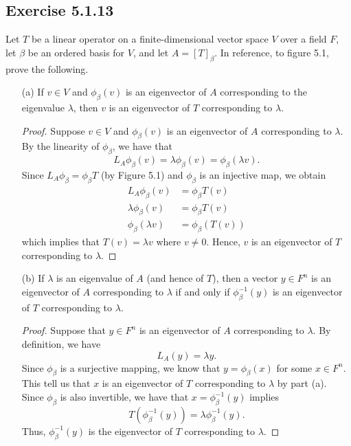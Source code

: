 \subsection*{Exercise 5.1.13} Let \( T  \) be a linear operator on a finite-dimensional vector space \( V  \) over a field \( F \), let \( \beta  \) be an ordered basis for \( V  \), and let \( A = [T]_{\beta} \). In reference, to figure 5.1, prove the following.
\begin{enumerate}
    \item[(a)] If \( v \in V  \) and \( {\phi}_{\beta}(v)  \) is an eigenvector of \( A  \) corresponding to the eigenvalue \( \lambda  \), then \( v  \) is an eigenvector of \( T  \) corresponding to \( \lambda  \).
        \begin{proof}
        Suppose \( v \in V  \) and \( {\phi}_{\beta}(v)  \) is an eigenvector of \( A  \) corresponding to \( \lambda  \). By the linearity of \( {\phi}_{\beta} \), we have that
        \[  {L}_{A}{\phi}_{\beta}(v) = \lambda {\phi}_{\beta}(v) = {\phi}_{\beta}(\lambda v ).  \]
        Since \( {L}_{A} {\phi}_{\beta} = {\phi}_{\beta}T  \) (by Figure 5.1) and \( {\phi}_{\beta} \) is an injective map, we obtain  
        \begin{align*}
            {L}_{A} {\phi}_{\beta} (v) &= {\phi}_{\beta}T(v) \\
            \lambda {\phi}_{\beta}(v) &= {\phi}_{\beta} T(v) \\
            {\phi}_{\beta}(\lambda v ) &= {\phi}_{\beta}(T(v))
        \end{align*}
        which implies that \( T(v) = \lambda v  \) where \( v \neq 0  \). Hence, \( v  \) is an eigenvector of \( T  \) corresponding to \( \lambda  \).
        \end{proof}
    \item[(b)] If \( \lambda  \) is an eigenvalue of \( A  \) (and hence of \( T \)), then a vector \( y \in F^{n} \) is an eigenvector of \( A  \) corresponding to \( \lambda  \) if and only if \( {\phi}_{\beta}^{-1}(y)  \) is an eigenvector of \( T  \) corresponding to \( \lambda  \).
        \begin{proof}
        Suppose that \( y \in F^{n} \) is an eigenvector of \( A  \) corresponding to \( \lambda  \). By definition, we have 
        \[ {L}_{A}(y) = \lambda y. \tag{1}\]
        Since \( {\phi}_{\beta} \) is a surjective mapping, we know that \( y = {\phi}_{\beta}(x)  \) for some \( x \in F^{n} \). This tell us that \( x  \) is an eigenvector of \( T  \) corresponding to \( \lambda  \) by part (a). Since \( {\phi}_{\beta} \) is also invertible, we have that \( x = {\phi}_{\beta}^{-1}(y) \) implies 
        \[  T( {\phi}_{\beta}^{-1}(y)) = \lambda {\phi}_{\beta}^{-1}(y). \]
        Thus, \( {\phi}_{\beta}^{-1}(y)  \) is the eigenvector of \( T  \) corresponding to \( \lambda  \). 


\end{proof}
\end{enumerate}
